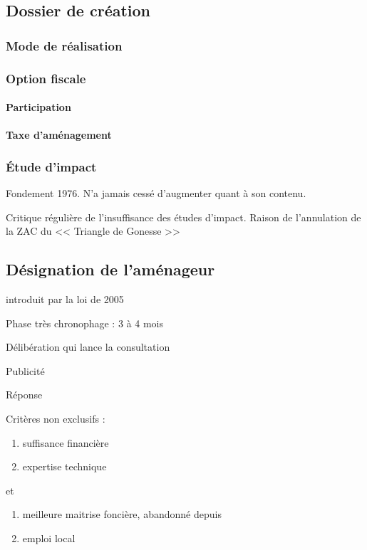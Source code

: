 	\subsection{Dossier de création}

		\subsubsection{Mode de réalisation}

		\subsubsection{Option fiscale}

			\paragraph{Participation}

			\paragraph{Taxe d'aménagement}

		\subsubsection{Étude d'impact}

			Fondement 1976. N'a jamais cessé d'augmenter quant à son contenu.

			Critique régulière de l'insuffisance des études d'impact. Raison de l'annulation de la ZAC du << Triangle de Gonesse >>

	\subsection{Désignation de l'aménageur}

		introduit par la loi de 2005

		Phase très chronophage : 3 à 4 mois

		Délibération qui lance la consultation

		Publicité

		Réponse

		Critères non exclusifs :
		\begin{enumerate}
			\item suffisance financière
			\item expertise technique
		\end{enumerate}
		et
		\begin{enumerate}
			\item meilleure maitrise foncière, abandonné depuis
			\item emploi local
		\end{enumerate}

